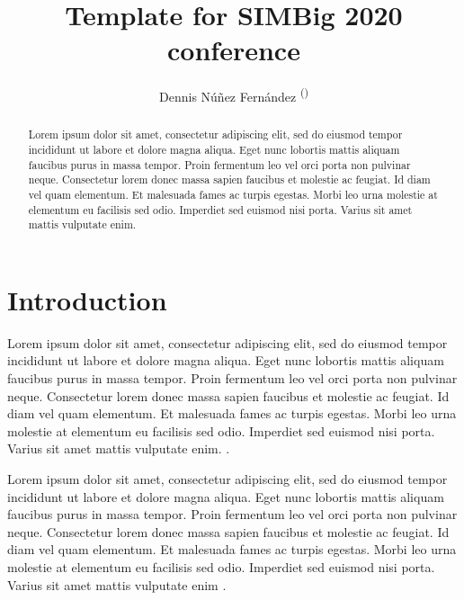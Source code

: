 \documentclass[runningheads]{llncs}
\begin{document}
%
\title{Template for SIMBig 2020 conference}
%
%
\author{
Dennis N\'u\~nez Fern\'andez \textsuperscript{(\Letter)} 
}
%
%
%
\maketitle              %
%
\begin{abstract}
Lorem ipsum dolor sit amet, consectetur adipiscing elit, sed do eiusmod tempor incididunt ut labore et dolore magna aliqua. Eget nunc lobortis mattis aliquam faucibus purus in massa tempor. Proin fermentum leo vel orci porta non pulvinar neque. Consectetur lorem donec massa sapien faucibus et molestie ac feugiat. Id diam vel quam elementum. Et malesuada fames ac turpis egestas. Morbi leo urna molestie at elementum eu facilisis sed odio. Imperdiet sed euismod nisi porta. Varius sit amet mattis vulputate enim.

\end{abstract}
%
%
%


\section{Introduction}

Lorem ipsum dolor sit amet, consectetur adipiscing elit, sed do eiusmod tempor incididunt ut labore et dolore magna aliqua. Eget nunc lobortis mattis aliquam faucibus purus in massa tempor. Proin fermentum leo vel orci porta non pulvinar neque. Consectetur lorem donec massa sapien faucibus et molestie ac feugiat. Id diam vel quam elementum. Et malesuada fames ac turpis egestas. Morbi leo urna molestie at elementum eu facilisis sed odio. Imperdiet sed euismod nisi porta. Varius sit amet mattis vulputate enim. \cite{b1}.

Lorem ipsum dolor sit amet, consectetur adipiscing elit, sed do eiusmod tempor incididunt ut labore et dolore magna aliqua. Eget nunc lobortis mattis aliquam faucibus purus in massa tempor. Proin fermentum leo vel orci porta non pulvinar neque. Consectetur lorem donec massa sapien faucibus et molestie ac feugiat. Id diam vel quam elementum. Et malesuada fames ac turpis egestas. Morbi leo urna molestie at elementum eu facilisis sed odio. Imperdiet sed euismod nisi porta. Varius sit amet mattis vulputate enim \cite{b2} \cite{b3} \cite{b4} \cite{b5}.
\end{document}
